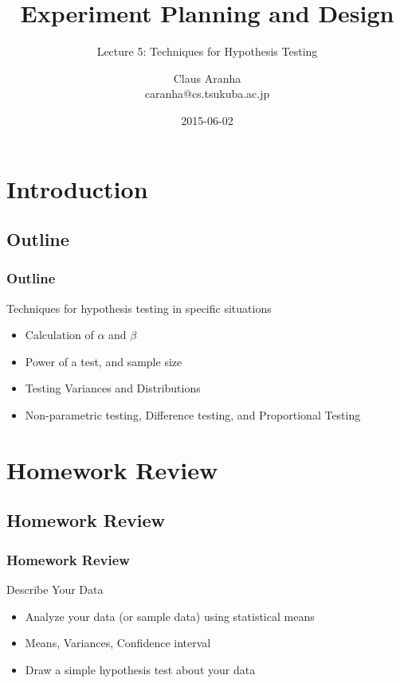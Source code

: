\documentclass[10pt]{beamer}
\title[]{Experiment Planning and Design}
\subtitle[]{Lecture 5: Techniques for Hypothesis Testing}
\author[Claus Aranha]{Claus Aranha\\{\footnotesize caranha@cs.tsukuba.ac.jp}}
\institute{Department of Computer Science}
\date{2015-06-02}
\begin{document}
\section{Introduction}
\subsection{Outline}

\begin{frame}
  \maketitle
\end{frame}

\begin{frame}
  \frametitle{Outline}
  \begin{block}{}
    Techniques for hypothesis testing in specific situations
  \end{block}
  \begin{itemize}
  \item Calculation of $\alpha$ and $\beta$
  \item Power of a test, and sample size
  \item Testing Variances and Distributions
  \item Non-parametric testing, Difference testing, and Proportional Testing
  \end{itemize}
\end{frame}

\section{Homework Review}
\subsection{Homework Review}
\begin{frame}
  \frametitle{Homework Review}

  \begin{block}{Describe Your Data}
    \begin{itemize}
    \item Analyze your data (or sample data) using statistical means
    \item Means, Variances, Confidence interval
    \item Draw a simple hypothesis test about your data
    \end{itemize}
  \end{block}
\end{frame}
\end{document}
